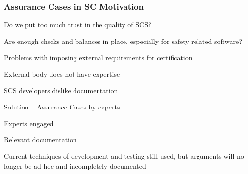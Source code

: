 \documentclass[t,12pt,numbers,fleqn]{beamer}
\begin{document}

\begin{frame}
\frametitle{Assurance Cases in SC Motivation}

\bi
\item Do we put too much trust in the quality of SCS?
\item Are enough checks and balances in place, especially for safety related
  software?
\item Problems with imposing external requirements for certification
\bi
\item External body does not have expertise
\item SCS developers dislike documentation
\ei
\item Solution -- Assurance Cases by experts
\bi
\item Experts engaged
\item Relevant documentation
\ei
\item Current techniques of development and testing still used, but arguments
  will no longer be ad hoc and incompletely documented
\ei

\end{frame}

\end{document}
